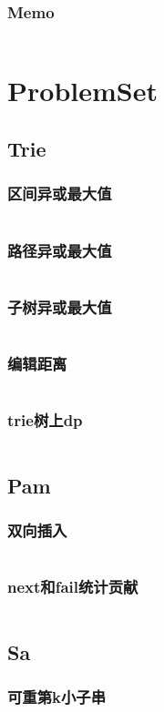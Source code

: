 \documentclass[a4paper,12pt]{article}
\begin{document}
\subsubsection{Memo}
\inputminted[]{c++}{Template/String/usage/sam-1.cpp}
\section{ProblemSet}
\subsection{Trie}
\subsubsection{区间异或最大值}
\inputminted[]{c++}{code/bzoj3261.cpp}
\subsubsection{路径异或最大值}
\inputminted[]{c++}{code/hdu4757.cpp}
\subsubsection{子树异或最大值}
\inputminted[]{c++}{code/hdu6191.cpp}
\subsubsection{编辑距离}
\inputminted[]{c++}{code/bzoj1819.cpp}
\subsubsection{trie树上dp}
\inputminted[]{c++}{code/UVALive3942.cpp}
\subsection{Pam}
\subsubsection{双向插入}
\inputminted[]{c++}{code/hdu5421.cpp}
\subsubsection{next和fail统计贡献}
\inputminted[]{c++}{code/nc886C.cpp}
\subsection{Sa}
\subsubsection{可重第k小子串}
\inputminted[]{c++}{code/cf128B.cpp}
\end{document}
